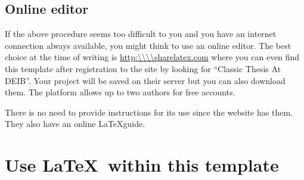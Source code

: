 \subsection{Online editor}
If the above procedure seems too difficult to you and you have an internet connection always available, you might think to use an online editor.
The best choice at the time of writing is \url{http:\\\\sharelatex.com} where you can even find this template after registration to the site by looking for \enquote{Classic Thesis At DEIB}.
Your project will be saved on their server but you can also download them.
The platform allows up to two authors for free accounts.

There is no need to provide instructions for its use since the website has them.
They also have an online \LaTeX guide.

\section{Use \LaTeX\ within this template}

